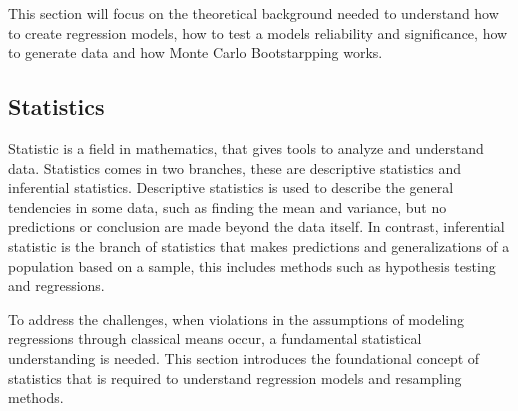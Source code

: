 This section will focus on the theoretical background needed to understand how to create regression models, how to test a models reliability and significance, how to generate data and how Monte Carlo Bootstarpping works.

\subsection{Statistics}

Statistic is a field in mathematics, that gives tools to analyze and understand data. Statistics comes in two branches, these are descriptive statistics and inferential statistics. Descriptive statistics is used to describe the general tendencies in some data, such as finding the mean and variance, but no predictions or conclusion are made beyond the data itself. In contrast, inferential statistic is the branch of statistics that makes predictions and generalizations of a population based on a sample, this includes methods such as hypothesis testing and regressions. 

To address the challenges, when violations in the assumptions of modeling regressions through classical means occur, a fundamental statistical understanding is needed. This section introduces the foundational concept of statistics that is required to understand regression models and resampling methods.






\newpage

